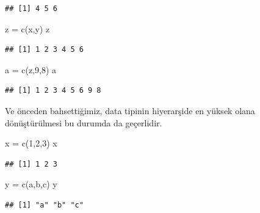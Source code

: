 \documentclass[
]{book}
\newenvironment{Shaded}{\begin{snugshade}}{\end{snugshade}}
\newcommand{\DecValTok}[1]{\textcolor[rgb]{0.00,0.00,0.81}{#1}}
\newcommand{\FunctionTok}[1]{\textcolor[rgb]{0.00,0.00,0.00}{#1}}
\newcommand{\NormalTok}[1]{#1}
\newcommand{\OtherTok}[1]{\textcolor[rgb]{0.56,0.35,0.01}{#1}}
\newcommand{\StringTok}[1]{\textcolor[rgb]{0.31,0.60,0.02}{#1}}
\begin{document}
\begin{verbatim}
## [1] 4 5 6
\end{verbatim}

\begin{Shaded}
\begin{Highlighting}[]
\NormalTok{z }\OtherTok{=} \FunctionTok{c}\NormalTok{(x,y)}
\NormalTok{z}
\end{Highlighting}
\end{Shaded}

\begin{verbatim}
## [1] 1 2 3 4 5 6
\end{verbatim}

\begin{Shaded}
\begin{Highlighting}[]
\NormalTok{a }\OtherTok{=} \FunctionTok{c}\NormalTok{(z,}\DecValTok{9}\NormalTok{,}\DecValTok{8}\NormalTok{)}
\NormalTok{a}
\end{Highlighting}
\end{Shaded}

\begin{verbatim}
## [1] 1 2 3 4 5 6 9 8
\end{verbatim}

Ve önceden bahsettiğimiz, data tipinin hiyerarşide en yüksek olana dönüştürülmesi bu durumda da geçerlidir.

\begin{Shaded}
\begin{Highlighting}[]
\NormalTok{x }\OtherTok{=} \FunctionTok{c}\NormalTok{(}\DecValTok{1}\NormalTok{,}\DecValTok{2}\NormalTok{,}\DecValTok{3}\NormalTok{)}
\NormalTok{x}
\end{Highlighting}
\end{Shaded}

\begin{verbatim}
## [1] 1 2 3
\end{verbatim}

\begin{Shaded}
\begin{Highlighting}[]
\NormalTok{y }\OtherTok{=} \FunctionTok{c}\NormalTok{(}\StringTok{\textquotesingle{}a\textquotesingle{}}\NormalTok{,}\StringTok{\textquotesingle{}b\textquotesingle{}}\NormalTok{,}\StringTok{\textquotesingle{}c\textquotesingle{}}\NormalTok{)}
\NormalTok{y}
\end{Highlighting}
\end{Shaded}

\begin{verbatim}
## [1] "a" "b" "c"
\end{verbatim}
\end{document}
